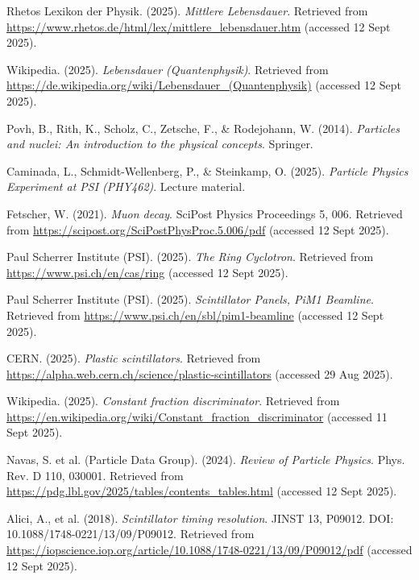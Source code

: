 \documentclass[11pt,a4paper]{article}
\begin{document}
\begin{thebibliography}{99}

Rhetos Lexikon der Physik. (2025). \textit{Mittlere Lebensdauer}. 
Retrieved from \url{https://www.rhetos.de/html/lex/mittlere_lebensdauer.htm} (accessed 12 Sept 2025).

Wikipedia. (2025). \textit{Lebensdauer (Quantenphysik)}. 
Retrieved from \url{https://de.wikipedia.org/wiki/Lebensdauer_(Quantenphysik)} (accessed 12 Sept 2025).

Povh, B., Rith, K., Scholz, C., Zetsche, F., \& Rodejohann, W. (2014). \textit{Particles and nuclei: An introduction to the physical concepts}. Springer. 

Caminada, L., Schmidt-Wellenberg, P., \& Steinkamp, O. (2025). \textit{Particle Physics Experiment at PSI (PHY462)}. Lecture material.

Fetscher, W. (2021). \textit{Muon decay}. SciPost Physics Proceedings 5, 006.  
Retrieved from \url{https://scipost.org/SciPostPhysProc.5.006/pdf} (accessed 12 Sept 2025).

Paul Scherrer Institute (PSI). (2025). \textit{The Ring Cyclotron}.  
Retrieved from \url{https://www.psi.ch/en/cas/ring} (accessed 12 Sept 2025).

Paul Scherrer Institute (PSI). (2025). \textit{Scintillator Panels, PiM1 Beamline}.  
Retrieved from \url{https://www.psi.ch/en/sbl/pim1-beamline} (accessed 12 Sept 2025).

CERN. (2025). \textit{Plastic scintillators}.  
Retrieved from \url{https://alpha.web.cern.ch/science/plastic-scintillators} (accessed 29 Aug 2025).

Wikipedia. (2025). \textit{Constant fraction discriminator}.  
Retrieved from \url{https://en.wikipedia.org/wiki/Constant_fraction_discriminator} (accessed 11 Sept 2025).

Navas, S. et al. (Particle Data Group). (2024). \textit{Review of Particle Physics}. Phys. Rev. D 110, 030001.  
Retrieved from \url{https://pdg.lbl.gov/2025/tables/contents_tables.html} (accessed 12 Sept 2025).

Alici, A., et al. (2018). \textit{Scintillator timing resolution}. JINST 13, P09012.  
DOI: 10.1088/1748-0221/13/09/P09012. Retrieved from \url{https://iopscience.iop.org/article/10.1088/1748-0221/13/09/P09012/pdf} (accessed 12 Sept 2025).



\end{thebibliography}
\end{document}
